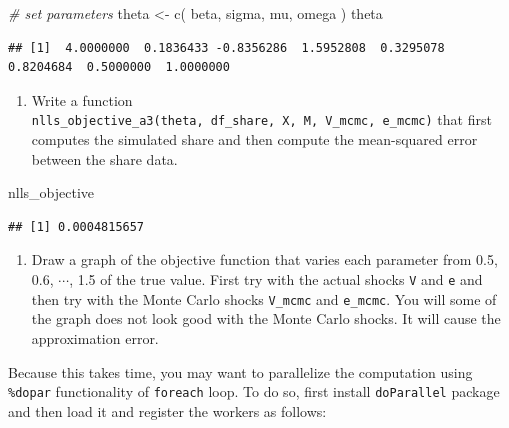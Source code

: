 \documentclass[
]{book}
\newenvironment{Shaded}{\begin{snugshade}}{\end{snugshade}}
\newcommand{\CommentTok}[1]{\textcolor[rgb]{0.56,0.35,0.01}{\textit{#1}}}
\newcommand{\FunctionTok}[1]{\textcolor[rgb]{0.00,0.00,0.00}{#1}}
\newcommand{\NormalTok}[1]{#1}
\newcommand{\OtherTok}[1]{\textcolor[rgb]{0.56,0.35,0.01}{#1}}
\providecommand{\tightlist}{%
  \setlength{\itemsep}{0pt}\setlength{\parskip}{0pt}}
\begin{document}
\begin{Shaded}
\begin{Highlighting}[]
\CommentTok{\# set parameters}
\NormalTok{theta }\OtherTok{\textless{}{-}} 
  \FunctionTok{c}\NormalTok{(}
\NormalTok{    beta, }
\NormalTok{    sigma, }
\NormalTok{    mu, }
\NormalTok{    omega}
\NormalTok{    )}
\NormalTok{theta}
\end{Highlighting}
\end{Shaded}

\begin{verbatim}
## [1]  4.0000000  0.1836433 -0.8356286  1.5952808  0.3295078  0.8204684  0.5000000  1.0000000
\end{verbatim}

\begin{enumerate}
\def\labelenumi{\arabic{enumi}.}
\setcounter{enumi}{5}
\tightlist
\item
  Write a function \texttt{nlls\_objective\_a3(theta,\ df\_share,\ X,\ M,\ V\_mcmc,\ e\_mcmc)} that first computes the simulated share and then compute the mean-squared error between the share data.
\end{enumerate}

\begin{Shaded}
\begin{Highlighting}[]
\NormalTok{nlls\_objective}
\end{Highlighting}
\end{Shaded}

\begin{verbatim}
## [1] 0.0004815657
\end{verbatim}

\begin{enumerate}
\def\labelenumi{\arabic{enumi}.}
\setcounter{enumi}{6}
\tightlist
\item
  Draw a graph of the objective function that varies each parameter from 0.5, 0.6, \(\cdots\), 1.5 of the true value. First try with the actual shocks \texttt{V} and \texttt{e} and then try with the Monte Carlo shocks \texttt{V\_mcmc} and \texttt{e\_mcmc}. You will some of the graph does not look good with the Monte Carlo shocks. It will cause the approximation error.
\end{enumerate}

Because this takes time, you may want to parallelize the computation using \texttt{\%dopar} functionality of \texttt{foreach} loop. To do so, first install \texttt{doParallel} package and then load it and register the workers as follows:
\end{document}
